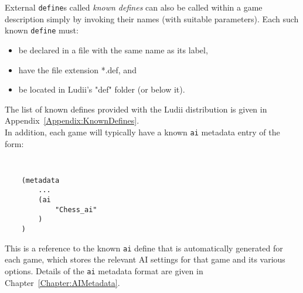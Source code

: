 External {\tt define}s called {\it known defines} can also be called within a game description simply by invoking their names (with suitable parameters). 
Each such known {\tt define} must: 
\begin{itemize}
\item be declared in a file with the same name as its label, 
\item have the file extension *.def, and 
\item be located in Ludii's "def" folder (or below it). 
\end{itemize}

\phantom{}
\noindent
The list of known defines provided with the Ludii distribution is given in Appendix~\ref{Appendix:KnownDefines}. \\
In addition, each game will typically have a known {\tt ai} metadata entry of the form:

{\tt
\begin{verbatim}
    (metadata
        ...
        (ai 
            "Chess_ai"
        )
    )    
\end{verbatim}
}

This is a reference to the known {\tt ai} define that is automatically generated for each game, which stores the relevant AI settings for that game and its various options.
Details of the  {\tt ai} metadata format are given in Chapter~\ref{Chapter:AIMetadata}.

